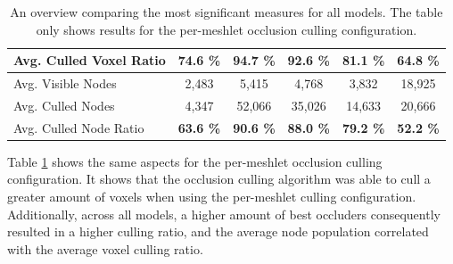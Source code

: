 \begin{table}[!htb]
\begin{tabular}{|lccccc|}
    \multicolumn{1}{|l|}{Avg. Culled Voxel Ratio}   & \multicolumn{1}{c|}{\textbf{74.6 \%}}         & \multicolumn{1}{c|}{\textbf{94.7 \%}}         & \multicolumn{1}{c|}{\textbf{92.6 \%}} & \multicolumn{1}{c|}{\textbf{81.1 \%}}     & \multicolumn{1}{c|}{\textbf{64.8 \%}}     \\ \hline
    \multicolumn{1}{|l|}{Avg. Visible Nodes}        & \multicolumn{1}{c|}{2,483}                    & \multicolumn{1}{c|}{5,415}                    & \multicolumn{1}{c|}{4,768}            & \multicolumn{1}{c|}{3,832}                & \multicolumn{1}{c|}{18,925}               \\
    \multicolumn{1}{|l|}{Avg. Culled Nodes}         & \multicolumn{1}{c|}{4,347}                    & \multicolumn{1}{c|}{52,066}                   & \multicolumn{1}{c|}{35,026}           & \multicolumn{1}{c|}{14,633}               & \multicolumn{1}{c|}{20,666}               \\
    \multicolumn{1}{|l|}{Avg. Culled Node Ratio}    & \multicolumn{1}{c|}{\textbf{63.6 \%}}         & \multicolumn{1}{c|}{\textbf{90.6 \%}}         & \multicolumn{1}{c|}{\textbf{88.0 \%}} & \multicolumn{1}{c|}{\textbf{79.2 \%}}     & \multicolumn{1}{c|}{\textbf{52.2 \%}}     \\ \hline
  \end{tabular}
  \caption{An overview comparing the most significant measures for all models. 
  The table only shows results for the per-meshlet occlusion culling configuration.}
  \label{tbl:culling-result-overview-pmoc}
\end{table}

\noindent
Table \ref{tbl:culling-result-overview-pmoc} shows the same aspects for the per-meshlet occlusion culling 
configuration. It shows that the occlusion culling algorithm was able to cull a greater amount of voxels 
when using the per-meshlet culling configuration. Additionally, across all models, a higher amount of 
best occluders consequently resulted in a higher culling ratio, and the average node population correlated 
with the average voxel culling ratio.

